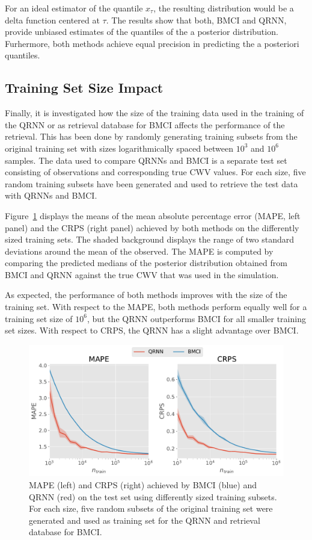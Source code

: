 \documentclass[journal abbreviation, manuscript]{copernicus}
\begin{document}
  For an ideal estimator of the quantile $x_\tau$, the resulting distribution
  would be a delta function centered at $\tau$. The results show that both, BMCI
  and QRNN, provide unbiased estimates of the quantiles of the a posterior
  distribution. Furhermore, both methods achieve equal precision in predicting
  the a posteriori quantiles.

\subsection{Training Set Size Impact}

Finally, it is investigated how the size of the training data used in the
training of the QRNN or as retrieval database for BMCI affects the performance
of the retrieval. This has been done by randomly generating training subsets
from the original training set with sizes logarithmically spaced between $10^3$
and $10^6$ samples. The data used to compare QRNNs and BMCI is a separate test
set consisting of observations and corresponding true CWV values. For each size,
five random training subsets have been generated and used to retrieve the test
data with QRNNs and BMCI.

Figure~\ref{fig:mape_crps} displays the means of the mean absolute percentage
error (MAPE, left panel) and the CRPS (right panel) achieved by both methods on
the differently sized training sets. The shaded background displays the range of
two standard deviations around the mean of the observed. The MAPE is computed by
comparing the predicted medians of the posterior distribution obtained from BMCI
and QRNN against the true CWV that was used in the simulation.

As expected, the performance of both methods improves with the size of the
training set. With respect to the MAPE, both methods perform equally well for a
training set size of $10^6$, but the QRNN outperforms BMCI for all smaller
training set sizes. With respect to CRPS, the QRNN has a slight advantage
over BMCI.

  \begin{figure}[hbpt!]
    \centering
    \includegraphics[width = 0.8\linewidth]{../plots/mape_crps}
    \caption{MAPE (left) and CRPS (right) achieved by BMCI (blue) and QRNN (red)
      on the test set using differently sized training subsets. For each size,
      five random subsets of the original training set were generated and used
      as training set for the QRNN and retrieval database for BMCI.}
    \label{fig:mape_crps}
  \end{figure}
\end{document}
